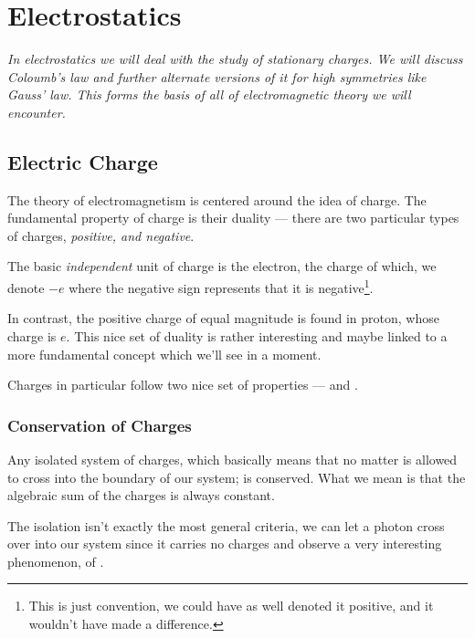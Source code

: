 \chapter{Electrostatics}


\emph{In electrostatics we will deal with the study of stationary charges. We will 
discuss Coloumb's law and further alternate versions of it 
for high symmetries like Gauss' law. This forms the basis of all 
of electromagnetic theory we will encounter.}

\section{Electric Charge}

The theory of electromagnetism is centered around the idea of charge. The 
fundamental property of charge is their duality --- there are two 
particular types of charges, \emph{positive, and negative}. 

The basic \emph{independent} unit of charge is the electron, the charge of which, 
we denote \(-e\) where the negative sign represents that it is negative\footnote{This
is just convention, we could have as well denoted it positive, and it wouldn't 
have made a difference.}. 

In contrast, the positive charge of equal magnitude is found in proton, 
whose charge is \(e\). This nice set of duality is rather interesting and maybe 
linked to a more fundamental concept which we'll see in a moment. 

Charges in particular follow two nice set of properties ---  and 
.

\subsection{Conservation of Charges}

Any isolated system of charges, which basically means that no matter is allowed 
to cross into the boundary of our system; is conserved. What we mean is that the 
algebraic sum of the charges is always constant.

The isolation isn't exactly the most general criteria, we can let a photon 
cross over into our system since it carries no charges and observe a very interesting 
phenomenon, of . 

